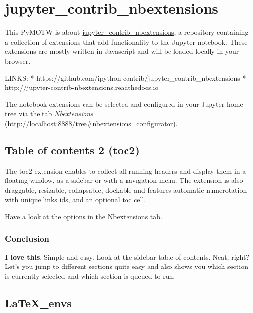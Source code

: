 
    
    
    
    


    


    
    \section{jupyter\_contrib\_nbextensions}\label{jupyterux5fcontribux5fnbextensions}

This PyMOTW is about
\href{https://github.com/ipython-contrib/jupyter_contrib_nbextensions}{jupyter\_contrib\_nbextensions},
a repository containing a collection of extensions that add
functionality to the Jupyter notebook. These extensions are mostly
written in Javascript and will be loaded locally in your browser.

LINKS: *
https://github.com/ipython-contrib/jupyter\_contrib\_nbextensions *
http://jupyter-contrib-nbextensions.readthedocs.io

The notebook extensions can be selected and configured in your Jupyter
home tree via the tab \emph{Nbextensions}
(http://localhost:8888/tree\#nbextensions\_configurator).

    \subsection{Table of contents 2 (toc2)}\label{table-of-contents-2-toc2}

The toc2 extension enables to collect all running headers and display
them in a floating window, as a sidebar or with a navigation menu. The
extension is also draggable, resizable, collapsable, dockable and
features automatic numerotation with unique links ids, and an optional
toc cell.

Have a look at the options in the Nbextensions tab.

\subsubsection{Conclusion}\label{conclusion}

\textbf{I love this}. Simple and easy. Look at the sidebar table of
contents. Neat, right? Let's you jump to different sections quite easy
and also shows you which section is {currently selected} and which
section is {queued to run}.

    \subsection{LaTeX\_envs}\label{latexux5fenvs}

